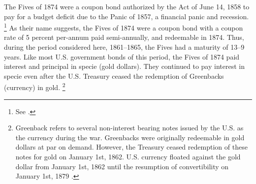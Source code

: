 The Fives of 1874 were a coupon bond authorized by the Act of June 14, 1858 to pay for a budget deficit due to the Panic of 1857, a financial panic and recession.%
\footnote{
  See \textcites[p. 76]{Bayley1882}[78--79]{DeKnight1900}[42-43]{Treasury1863}[300-301, 305]{HomerSylla2005}.
}
As their name suggests, the Fives of 1874 were a coupon bond with a coupon rate of 5 percent per-annum paid semi-annually, and redeemable in 1874.
Thus, during the period considered here, 1861--1865, the Fives had a maturity of 13--9 years.
Like most U.S. government bonds of this period, the Fives of 1874 paid interest and principal in specie (gold dollars).
They continued to pay interest in specie even after the U.S. Treasury ceased the redemption of Greenbacks (currency) in gold.%
\footnote{
Greenback refers to several non-interest bearing notes issued by the U.S. as the currency during the war.
Greenbacks were originally redeemable in gold dollars at par on demand. 
However, the Treasury ceased redemption of these notes for gold on January 1st, 1862.
U.S. currency floated against the gold dollar from January 1st, 1862 until the resumption of convertibility on January 1st, 1879 \parencites{Mitchell1908}{Dewey1918}{WillardGuinnaneEtAl1996}.
}

